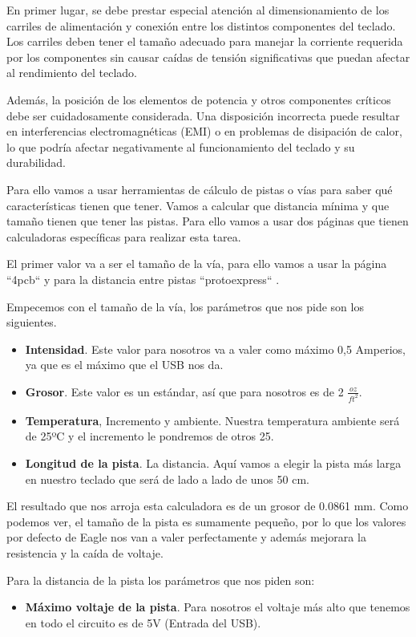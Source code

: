 En primer lugar, se debe prestar especial atención al dimensionamiento de los carriles de alimentación y conexión entre los distintos componentes del teclado. Los carriles deben tener el tamaño adecuado para manejar la corriente requerida por los componentes sin causar caídas de tensión significativas que puedan afectar al rendimiento del teclado.

Además, la posición de los elementos de potencia y otros componentes críticos debe ser cuidadosamente considerada. Una disposición incorrecta puede resultar en interferencias electromagnéticas (EMI) o en problemas de disipación de calor, lo que podría afectar negativamente al funcionamiento del teclado y su durabilidad.

Para ello vamos a usar herramientas de cálculo de pistas o vías para saber qué características tienen que tener. Vamos a calcular que distancia mínima y que tamaño tienen que tener las pistas. Para ello vamos a usar dos páginas que tienen calculadoras específicas para realizar esta tarea.

El primer valor va a ser el tamaño de la vía, para ello vamos a usar la página ``4pcb`` \cite{4pcbCalculator} y para la distancia entre pistas ``protoexpress`` \cite{protoexpressCalculator}. 

Empecemos con el tamaño de la vía, los parámetros que nos pide son los siguientes.
\begin{itemize}
    \item \textbf{Intensidad}. Este valor para nosotros va a valer como máximo 0,5 Amperios, ya que es el máximo que el \gls{USB} nos da.
    \item \textbf{Grosor}. Este valor es un estándar, así que para nosotros es de 2 $\frac{oz}{ft^2}$.
    \item \textbf{Temperatura}, Incremento y ambiente. Nuestra temperatura ambiente será de 25ºC y el incremento le pondremos de otros 25.
    \item \textbf{Longitud de la pista}. La distancia. Aquí vamos a elegir la pista más larga en nuestro teclado que será de lado a lado de unos 50 cm.
\end{itemize}

El resultado que nos arroja esta calculadora es de un grosor de 0.0861 mm. Como podemos ver, el tamaño de la pista es sumamente pequeño, por lo que los valores por defecto de Eagle nos van a valer perfectamente y además mejorara la resistencia y la caída de voltaje.

Para la distancia de la pista los parámetros que nos piden son:
\begin{itemize}
    \item \textbf{Máximo voltaje de la pista}. Para nosotros el voltaje más alto que tenemos en todo el circuito es de 5V (Entrada del \gls{USB}).
\end{itemize}

